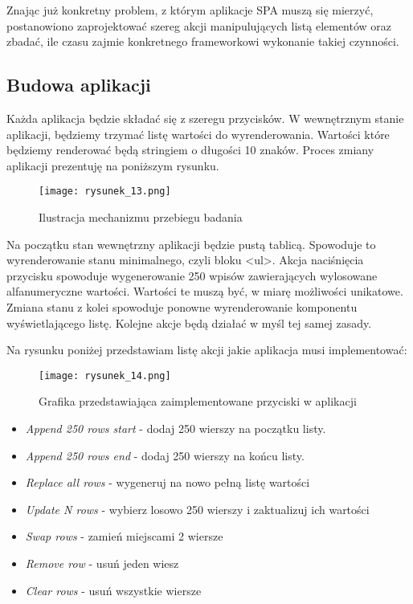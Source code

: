 Znając już konkretny problem, z którym aplikacje SPA muszą się mierzyć, postanowiono zaprojektować szereg akcji manipulujących listą elementów oraz zbadać, ile czasu zajmie konkretnego frameworkowi wykonanie takiej czynności.

\subsection{Budowa aplikacji}

Każda aplikacja będzie składać się z szeregu przycisków. W wewnętrznym stanie aplikacji, będziemy trzymać listę wartości do wyrenderowania. Wartości które będziemy renderować będą stringiem o długości 10 znaków. Proces zmiany aplikacji prezentuję na poniższym rysunku.
\begin{figure}[htbp]
    \centering
    \texttt{[image: rysunek\_13.png]}
    \caption{Ilustracja mechanizmu przebiegu badania}
    \label{fig:rysunek_13}
\end{figure}

Na początku stan wewnętrzny aplikacji będzie pustą tablicą. Spowoduje to wyrenderowanie stanu minimalnego, czyli bloku <ul>.
Akcja naciśnięcia przycisku spowoduje wygenerowanie 250 wpisów zawierających wylosowane alfanumeryczne wartości. Wartości te muszą być, w miarę możliwości unikatowe.
Zmiana stanu z kolei spowoduje ponowne wyrenderowanie komponentu wyświetlającego listę. Kolejne akcje będą działać w myśl tej samej zasady.

Na rysunku poniżej przedstawiam listę akcji jakie aplikacja musi implementować:

\begin{figure}[htbp]
    \centering
    \texttt{[image: rysunek\_14.png]}
    \caption{Grafika przedstawiająca zaimplementowane przyciski w aplikacji}
    \label{fig:rysunek_14}
\end{figure}

\begin{itemize}
    \item \emph{Append 250 rows start} - dodaj 250 wierszy na początku listy.
    \item \emph{Append 250 rows end} - dodaj 250 wierszy na końcu listy.
    \item \emph{Replace all rows} - wygeneruj na nowo pełną listę wartości
    \item \emph{Update N rows} - wybierz losowo 250 wierszy i zaktualizuj ich wartości
    \item \emph{Swap rows} - zamień miejscami 2 wiersze
    \item \emph{Remove row} - usuń jeden wiesz
    \item \emph{Clear rows} - usuń wszystkie wiersze
\end{itemize}

